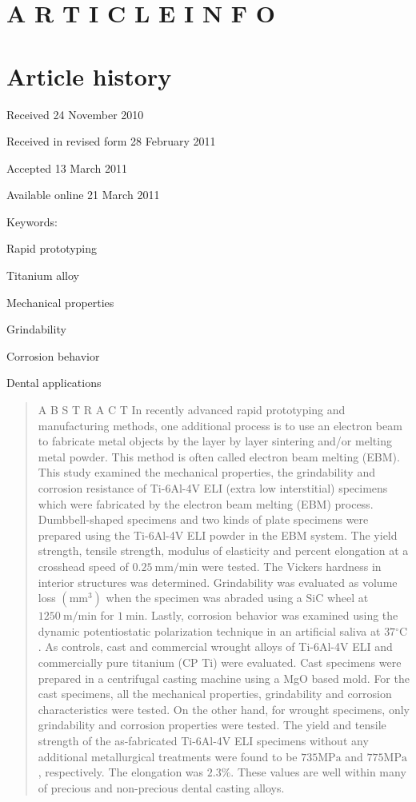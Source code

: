 \documentclass[10pt]{article}
\begin{document}
\section*{A R T I C L E I N F O}
\section*{Article history}
Received 24 November 2010

Received in revised form 28 February 2011

Accepted 13 March 2011

Available online 21 March 2011

Keywords:

Rapid prototyping

Titanium alloy

Mechanical properties

Grindability

Corrosion behavior

Dental applications

\begin{abstract}
A B S T R A C T In recently advanced rapid prototyping and manufacturing methods, one additional process is to use an electron beam to fabricate metal objects by the layer by layer sintering and/or melting metal powder. This method is often called electron beam melting (EBM). This study examined the mechanical properties, the grindability and corrosion resistance of Ti-6Al-4V ELI (extra low interstitial) specimens which were fabricated by the electron beam melting (EBM) process. Dumbbell-shaped specimens and two kinds of plate specimens were prepared using the Ti-6Al-4V ELI powder in the EBM system. The yield strength, tensile strength, modulus of elasticity and percent elongation at a crosshead speed of $0.25 \mathrm{~mm} / \mathrm{min}$ were tested. The Vickers hardness in interior structures was determined. Grindability was evaluated as volume loss $\left(\mathrm{mm}^{3}\right)$ when the specimen was abraded using a $\mathrm{SiC}$ wheel at $1250 \mathrm{~m} / \mathrm{min}$ for $1 \mathrm{~min}$. Lastly, corrosion behavior was examined using the dynamic potentiostatic polarization technique in an artificial saliva at $37{ }^{\circ} \mathrm{C}$. As controls, cast and commercial wrought alloys of Ti-6Al-4V ELI and commercially pure titanium (CP Ti) were evaluated. Cast specimens were prepared in a centrifugal casting machine using a MgO based mold. For the cast specimens, all the mechanical properties, grindability and corrosion characteristics were tested. On the other hand, for wrought specimens, only grindability and corrosion properties were tested. The yield and tensile strength of the as-fabricated Ti-6Al-4V ELI specimens without any additional metallurgical treatments were found to be $735 \mathrm{MPa}$ and $775 \mathrm{MPa}$, respectively. The elongation was $2.3 \%$. These values are well within many of precious and non-precious dental casting alloys.
\end{abstract}
\end{document}
